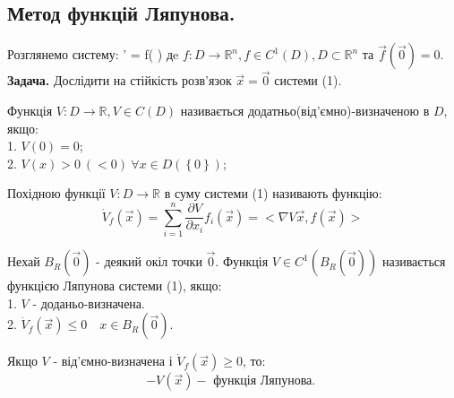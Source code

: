 \subsection{Метод функцій Ляпунова.}

Розглянемо систему:
\be
 ' = f( )
\ee
дe $f: D \to \mathbb{R}^n, f\in C^{1} \left( D \right), D \subset \mathbb{R}^n $ та $\overrightarrow{f} ( \overrightarrow{0}) = 0$.
\textbf{Задача. } Дослідити на стійкість розв'язок $ \overrightarrow{x} = \overrightarrow{0}$ системи (1).

 \begin{defo}
  Функція $V : D \to \mathbb{R} , V \in C(D) $ називається додатньо(від'ємно)-визначеною в $D$, якщо:
  \\1. $V(0) = 0$;\\
  2. $ V(x) > 0 \ (<0) \ \forall x \in D(\left\lbrace 0 \right\rbrace)$;
 \end{defo}

 \begin{defo}
Похідною функції $ V : D \to \mathbb{R}$ в суму системи (1) називають функцію:
$$
\dot{V}_f(\overrightarrow{x}) =  \sum\limits_{i = 1}^{n}{ \frac{\partial V}{ \partial x_i} f_{i}( \overrightarrow{x}) } = <\nabla V \overrightarrow{x}, f(\overrightarrow{x})>
$$
 \end{defo}

 \begin{defo}
  Нехай $B_{R} ( \overrightarrow{0} ) $ - деякий окіл точки $ \overrightarrow{0} $. Функція $V \in C^{1} (B_{R} (\overrightarrow{0}))$ називається функцією Ляпунова системи (1), якщо:\\
  1. $ V $ - доданьо-визначена. \\
  2. $ \dot{V}_f (\overrightarrow{x}) \leq 0 \quad x \in B_{R} ( \overrightarrow{0})$.
 \end{defo}

 \begin{remark}
     Якщо $ V $ - від'ємно-визначена і $ \dot{V}_f ( \overrightarrow{x}) \geq 0$, то:
     $$
     - V ( \overrightarrow{x} ) - \text{ функція Ляпунова. }
     $$
 \end{remark}

